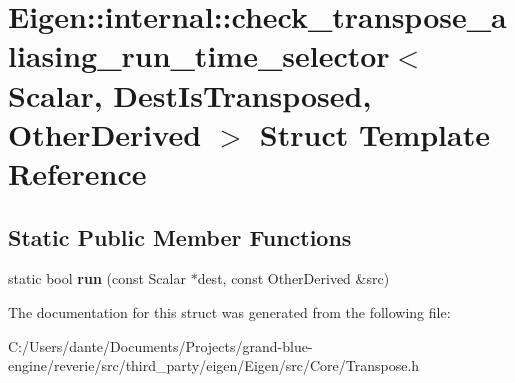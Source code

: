 \hypertarget{struct_eigen_1_1internal_1_1check__transpose__aliasing__run__time__selector}{}\section{Eigen\+::internal\+::check\+\_\+transpose\+\_\+aliasing\+\_\+run\+\_\+time\+\_\+selector$<$ Scalar, Dest\+Is\+Transposed, Other\+Derived $>$ Struct Template Reference}
\label{struct_eigen_1_1internal_1_1check__transpose__aliasing__run__time__selector}
\subsection*{Static Public Member Functions}
\begin{DoxyCompactItemize}
\item 
\mbox{\label{struct_eigen_1_1internal_1_1check__transpose__aliasing__run__time__selector_afe5ddaa724ea7106086bc07105d3a55f}} 
static bool {\bfseries run} (const Scalar $\ast$dest, const Other\+Derived \&src)
\end{DoxyCompactItemize}


The documentation for this struct was generated from the following file\+:\begin{DoxyCompactItemize}
\item 
C\+:/\+Users/dante/\+Documents/\+Projects/grand-\/blue-\/engine/reverie/src/third\+\_\+party/eigen/\+Eigen/src/\+Core/Transpose.\+h\end{DoxyCompactItemize}
